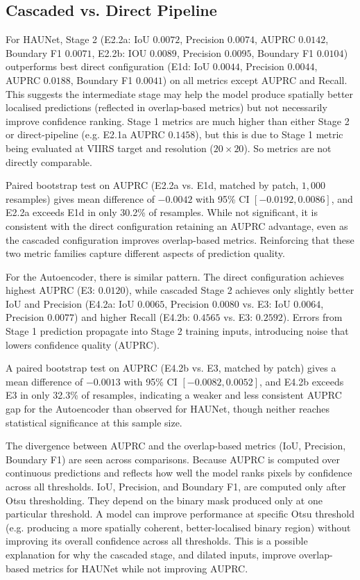 \documentclass[a4paper, 11pt]{article} %
\begin{document}
\subsection{Cascaded vs. Direct Pipeline}
For HAUNet, Stage 2 (E2.2a: IoU $0.0072$, Precision $0.0074$, AUPRC $0.0142$, Boundary F1 $0.0071$, E2.2b: IOU $0.0089$, Precision $0.0095$, Boundary F1 $0.0104$) outperforms best direct configuration (E1d: IoU $0.0044$, Precision $0.0044$, AUPRC $0.0188$, Boundary F1 $0.0041$) on all metrics except AUPRC and Recall. This suggests the intermediate stage may help the model produce spatially better localised predictions (reflected in overlap-based metrics) but not necessarily improve confidence ranking. Stage 1 metrics are much higher than either Stage 2 or direct-pipeline (e.g. E2.1a AUPRC $0.1458$), but this is due to Stage 1 metric being evaluated at VIIRS target and resolution ($20 \times 20$). So metrics are not directly comparable.

Paired bootstrap test on AUPRC (E2.2a vs. E1d, matched by patch, $1,000$ resamples) gives mean difference of $-0.0042$ with 95\% CI $[-0.0192, 0.0086]$, and E2.2a exceeds E1d in only 30.2\% of resamples. While not significant, it is consistent with the direct configuration retaining an AUPRC advantage, even as the cascaded configuration improves overlap-based metrics. Reinforcing that these two metric families capture different aspects of prediction quality.

For the Autoencoder, there is similar pattern. The direct configuration achieves highest AUPRC (E3: $0.0120$), while cascaded Stage 2 achieves only slightly better IoU and Precision (E4.2a: IoU $0.0065$, Precision $0.0080$ vs. E3: IoU $0.0064$, Precision $0.0077$) and higher Recall (E4.2b: $0.4565$ vs. E3: $0.2592$). Errors from Stage 1 prediction propagate into Stage 2 training inputs, introducing noise that lowers confidence quality (AUPRC).

A paired bootstrap test on AUPRC (E4.2b vs. E3, matched by patch) gives a mean difference of $-0.0013$ with 95\% CI $[-0.0082, 0.0052]$, and E4.2b exceeds E3 in only 32.3\% of resamples, indicating a weaker and less consistent AUPRC gap for the Autoencoder than observed for HAUNet, though neither reaches statistical significance at this sample size.

The divergence between AUPRC and the overlap-based metrics (IoU, Precision, Boundary F1) are seen across comparisons. Because AUPRC is computed over continuous predictions and reflects how well the model ranks pixels by confidence across all thresholds. IoU, Precision, and Boundary F1, are computed only after Otsu thresholding. They depend on the binary mask produced only at one particular threshold. A model can improve performance at specific Otsu threshold (e.g. producing a more spatially coherent, better-localised binary region) without improving its overall confidence across all thresholds. This is a possible explanation for why the cascaded stage, and dilated inputs, improve overlap-based metrics for HAUNet while not improving AUPRC.
\end{document}
